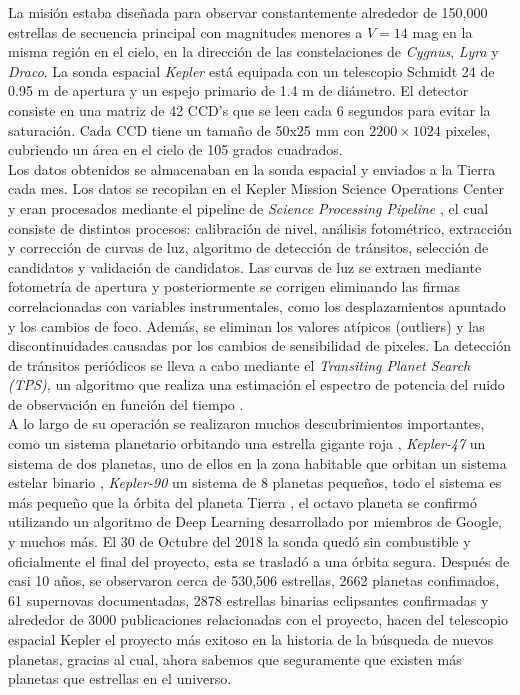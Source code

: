La misión estaba diseñada para observar constantemente alrededor de 150,000 estrellas de secuencia principal con magnitudes menores a $V=14$ mag en la misma región en el cielo, en la dirección de las constelaciones de \textit{Cygnus}, \textit{Lyra} y \textit{Draco}. La sonda espacial \textit{Kepler} está equipada con un telescopio Schmidt 24 de 0.95 m de apertura y un espejo primario de 1.4 m de diámetro. El detector consiste en una matriz de 42 CCD’s que se leen cada 6 segundos para evitar la saturación. Cada CCD tiene un tamaño de 50x25 mm con $2200\times 1024$ pixeles, cubriendo un área en el cielo de 105 grados cuadrados.\\

Los datos obtenidos se almacenaban en la sonda espacial y enviados a la Tierra cada mes. Los datos se recopilan en el Kepler Mission Science Operations Center y eran procesados mediante el pipeline de \textit{Science Processing Pipeline} \citep{jenkins2010overview}, el cual consiste de distintos procesos: calibración de nivel, análisis fotométrico, extracción y corrección de curvas de luz, algoritmo de detección de tránsitos, selección de candidatos y validación de candidatos. Las curvas de luz se extraen mediante fotometría de apertura y posteriormente se corrigen eliminando las firmas correlacionadas con variables instrumentales, como los desplazamientos apuntado y los cambios de foco.
Además, se eliminan los valores atípicos (outliers) y las discontinuidades causadas por los cambios de sensibilidad de pixeles. La detección de tránsitos periódicos se lleva a cabo mediante el \textit{Transiting Planet Search (TPS)}, un algoritmo que realiza una estimación el espectro de potencia del ruido de observación en función del tiempo \cite{jenkins2010transiting}.\\

A lo largo de su operación se realizaron muchos descubrimientos importantes, como un sistema planetario orbitando una estrella gigante roja \citep{charpinet2011compact}, \textit{Kepler-47} un sistema de dos planetas, uno de ellos en la zona habitable que orbitan un sistema estelar binario \citep{orosz2012kepler}, \textit{Kepler-90} un sistema de 8 planetas pequeños, todo el sistema es más pequeño que la órbita del planeta Tierra \citep{shallue2018identifying}, el octavo planeta se confirmó utilizando un algoritmo de Deep Learning desarrollado por miembros de Google, y muchos más. El 30 de Octubre del 2018 la sonda quedó sin combustible y oficialmente el final del proyecto, esta se trasladó a una órbita segura. Después de casi 10 años, se observaron cerca de 530,506 estrellas, 2662 planetas confimados, 61 supernovas documentadas, 2878 estrellas binarias eclipsantes confirmadas y alrededor de 3000 publicaciones relacionadas con el proyecto, hacen del telescopio espacial Kepler el proyecto más exitoso en la historia de la búsqueda de nuevos planetas, gracias al cual, ahora sabemos que seguramente que existen más planetas que estrellas en el universo.\\

